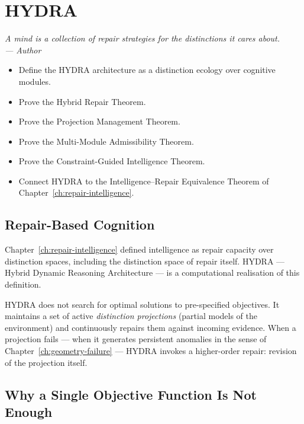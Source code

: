 \documentclass[12pt,twoside,openright]{book}
\newenvironment{epigraph}[2]{%
  \vspace{1em}\begin{flushright}
  \begin{minipage}{0.72\textwidth}
  \itshape\small #1\\[0.4em]
  \upshape\footnotesize\sffamily\color{DistGray}--- #2
  \end{minipage}\end{flushright}\vspace{1.5em}}{}
\newenvironment{objectives}{%
  \begin{tcolorbox}[colback=DistBlue!5,colframe=DistBlue,
    title={\faCheckCircle\enspace Learning Objectives},
    fonttitle=\sffamily\bfseries\color{white},
    attach boxed title to top left={yshift=-2mm,xshift=4mm},
    boxed title style={colback=DistBlue},breakable]
  \begin{itemize}[leftmargin=*,nosep]}{%
  \end{itemize}\end{tcolorbox}\vspace{1em}}
\begin{document}
\chapter{HYDRA}
\label{ch:hydra}

\begin{epigraph}{%
  A mind is a collection of repair strategies for
  the distinctions it cares about.}%
  {Author}
\end{epigraph}

\begin{objectives}
  \item Define the HYDRA architecture as a distinction
        ecology over cognitive modules.
  \item Prove the Hybrid Repair Theorem.
  \item Prove the Projection Management Theorem.
  \item Prove the Multi-Module Admissibility Theorem.
  \item Prove the Constraint-Guided Intelligence Theorem.
  \item Connect HYDRA to the Intelligence--Repair
        Equivalence Theorem of Chapter~\ref{ch:repair-intelligence}.
\end{objectives}

\section{Repair-Based Cognition}

Chapter~\ref{ch:repair-intelligence} defined intelligence
as repair capacity over distinction spaces, including
the distinction space of repair itself. HYDRA —
Hybrid Dynamic Reasoning Architecture — is a
computational realisation of this definition.

HYDRA does not search for optimal solutions to
pre-specified objectives. It maintains a set of
active \emph{distinction projections} (partial models
of the environment) and continuously repairs them
against incoming evidence. When a projection fails —
when it generates persistent anomalies in the sense of
Chapter~\ref{ch:geometry-failure} — HYDRA invokes a
higher-order repair: revision of the projection itself.

\section{Why a Single Objective Function Is Not Enough}
\label{sec:ch25-why-monolithic}
\end{document}
